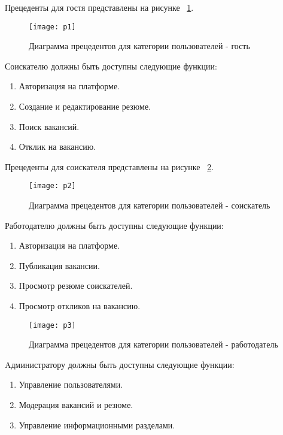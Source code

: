 Прецеденты для гостя представлены на рисунке ~\ref{p1:image}.

\begin{figure}[H]
	\texttt{[image: p1]}
	\caption{Диаграмма прецедентов для категории пользователей - гость}
	\label{p1:image}
\end{figure}

Соискателю должны быть доступны следующие функции:

\begin{enumerate}
	\item Авторизация на платформе.
	\item Создание и редактирование резюме.
	\item Поиск вакансий.
	\item Отклик на вакансию.
\end{enumerate}

Прецеденты для соискателя представлены на рисунке ~\ref{p2:image}.

\begin{figure}[H]
	\texttt{[image: p2]}
	\caption{Диаграмма прецедентов для категории пользователей - соискатель}
	\label{p2:image}
\end{figure}

Работодателю должны быть доступны следующие функции:

\begin{enumerate}
	\item Авторизация на платформе.
	\item Публикация вакансии.
	\item Просмотр резюме соискателей.
	\item Просмотр откликов на вакансию.
\end{enumerate}

\begin{figure}[H]
	\texttt{[image: p3]}
	\caption{Диаграмма прецедентов для категории пользователей - работодатель}
	\label{p3:image}
\end{figure}

Aдминистратору должны быть доступны следующие функции:

\begin{enumerate}
	\item Управление пользователями.
	\item Модерация вакансий и резюме.
	\item Управление информационными разделами.
\end{enumerate}

